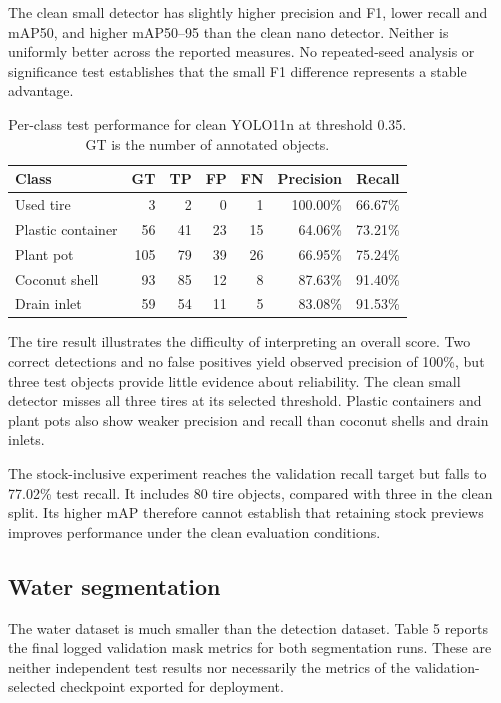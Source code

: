\documentclass[a4paper,11pt]{article}
\begin{document}
The clean small detector has slightly higher precision and F1, lower recall and mAP50, and higher mAP50–95 than the clean nano detector. Neither is uniformly better across the reported measures. No repeated-seed analysis or significance test establishes that the small F1 difference represents a stable advantage.

\begin{table}[!htbp]
\centering
\caption{Per-class test performance for clean YOLO11n at threshold 0.35. GT is the number of annotated objects.}
\label{tab:4}
\fontsize{9.5}{11.5}\selectfont
\setlength{\tabcolsep}{4.3pt}
\renewcommand{\arraystretch}{1.18}
\begin{tabularx}{\linewidth}{@{}>{\raggedright\arraybackslash}Xrrrrrr@{}}
\toprule
\textbf{Class} & \textbf{GT} & \textbf{TP} & \textbf{FP} & \textbf{FN} & \textbf{Precision} & \textbf{Recall} \\
\midrule
Used tire & 3 & 2 & 0 & 1 & 100.00\% & 66.67\% \\
Plastic container & 56 & 41 & 23 & 15 & 64.06\% & 73.21\% \\
Plant pot & 105 & 79 & 39 & 26 & 66.95\% & 75.24\% \\
Coconut shell & 93 & 85 & 12 & 8 & 87.63\% & 91.40\% \\
Drain inlet & 59 & 54 & 11 & 5 & 83.08\% & 91.53\% \\
\bottomrule
\end{tabularx}
\end{table}

The tire result illustrates the difficulty of interpreting an overall score. Two correct detections and no false positives yield observed precision of 100\%, but three test objects provide little evidence about reliability. The clean small detector misses all three tires at its selected threshold. Plastic containers and plant pots also show weaker precision and recall than coconut shells and drain inlets.

The stock-inclusive experiment reaches the validation recall target but falls to 77.02\% test recall. It includes 80 tire objects, compared with three in the clean split. Its higher mAP therefore cannot establish that retaining stock previews improves performance under the clean evaluation conditions.

\subsection{Water segmentation}

The water dataset is much smaller than the detection dataset. Table 5 reports the final logged validation mask metrics for both segmentation runs. These are neither independent test results nor necessarily the metrics of the validation-selected checkpoint exported for deployment.
\end{document}
